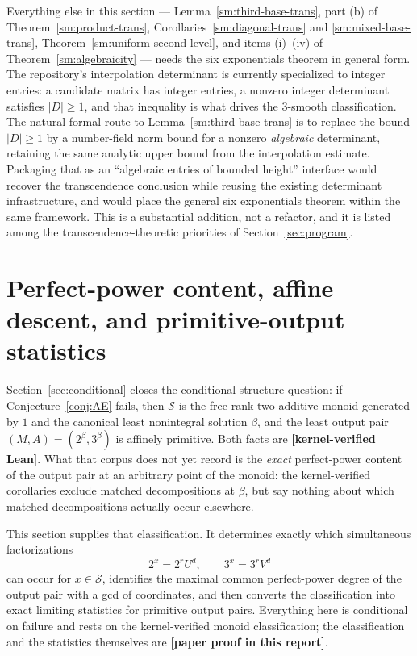 \documentclass[11pt,oneside]{article}
\theoremstyle{definition}
\theoremstyle{remark}
\newcommand{\Sol}{\mathcal S}
\newcommand{\statuslean}{\textcolor{leanblue}{\textbf{[kernel-verified Lean]}}}
\newcommand{\statusnew}{\textcolor{newgreen}{\textbf{[paper proof in this report]}}}
\begin{document}
Everything else in this section --- Lemma~\ref{sm:third-base-trans}, part (b) of
Theorem~\ref{sm:product-trans}, Corollaries~\ref{sm:diagonal-trans} and
\ref{sm:mixed-base-trans}, Theorem~\ref{sm:uniform-second-level}, and items (i)--(iv) of
Theorem~\ref{sm:algebraicity} --- needs the six exponentials theorem in general form.  The
repository's interpolation determinant is currently specialized to integer entries: a
candidate matrix has integer entries, a nonzero integer determinant satisfies $|D|\ge1$, and
that inequality is what drives the $3$-smooth classification.  The natural formal route to
Lemma~\ref{sm:third-base-trans} is to replace the bound $|D|\ge1$ by a number-field norm
bound for a nonzero \emph{algebraic} determinant, retaining the same analytic upper bound
from the interpolation estimate.  Packaging that as an ``algebraic entries of bounded
height'' interface would recover the transcendence conclusion while reusing the existing
determinant infrastructure, and would place the general six exponentials theorem within the
same framework.  This is a substantial addition, not a refactor, and it is listed among the
transcendence-theoretic priorities of Section~\ref{sec:program}.

\section{Perfect-power content, affine descent, and primitive-output statistics}\label{sec:powers}

Section~\ref{sec:conditional} closes the conditional structure question: if
Conjecture~\ref{conj:AE} fails, then $\Sol$ is the free rank-two additive monoid generated by
$1$ and the canonical least nonintegral solution $\beta$, and the least output pair
$(M,A)=(2^{\beta},3^{\beta})$ is affinely primitive.  Both facts are \statuslean{}.  What that
corpus does not yet record is the \emph{exact} perfect-power content of the output pair at an
arbitrary point of the monoid: the kernel-verified corollaries exclude matched decompositions
at $\beta$, but say nothing about which matched decompositions actually occur elsewhere.

This section supplies that classification.  It determines exactly which simultaneous
factorizations
\[
 2^x=2^rU^d,\qquad 3^x=3^rV^d
\]
can occur for $x\in\Sol$, identifies the maximal common perfect-power degree of the output
pair with a gcd of coordinates, and then converts the classification into exact limiting
statistics for primitive output pairs.  Everything here is conditional on failure and rests on
the kernel-verified monoid classification; the classification and the statistics themselves are
\statusnew{}.
\end{document}
